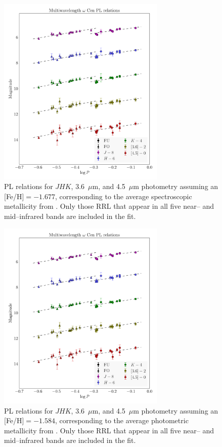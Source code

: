\documentclass[a4paper,fleqn,usenatbib]{mnras}
\begin{document}
\begin{figure}
\begin{center}
\includegraphics[width=80mm]{final_plots/multiwavelength_PL_samestars_spect.pdf}
\caption{PL relations for $J\!H\!K$, 3.6~$\mu$m, and 4.5~$\mu$m photometry assuming an [Fe/H]$=-1.677$, corresponding to the average  spectroscopic metallicity from \citet{2006ApJ...640L..43S}.  Only those RRL that appear in all five near-- and mid--infrared bands are included in the fit.}
\label{fig:omegaCen_pl_spect}
\end{center}
\end{figure}

\begin{figure}
\begin{center}
\includegraphics[width=80mm]{final_plots/multiwavelength_PL_samestars_phot.pdf}
\caption{PL relations for $J\!H\!K$, 3.6~$\mu$m, and 4.5~$\mu$m photometry assuming an [Fe/H]$=-1.584$, corresponding to the average photometric metallicity from \citet{2000AJ....119.1824R}. Only those RRL that appear in all five near-- and mid--infrared bands are included in the fit.}
\label{fig:omegaCen_pl_phot}
\end{center}
\end{figure}
\end{document}
